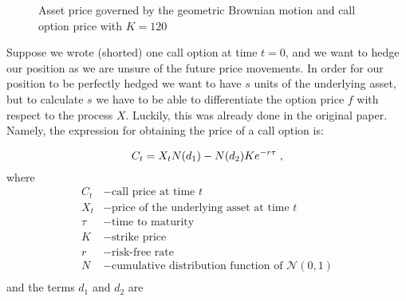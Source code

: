 \documentclass[times, utf8, diplomski]{fer}
\begin{document}
\begin{figure}[ht]
\centering

\caption{Asset price governed by the geometric Brownian motion and call option price with $K=120$}
\label{fig:gbm_price_process}	
\end{figure}
\noindent Suppose we wrote (shorted) one call option at time $t=0$, and we want to hedge our position as we are unsure of the future price movements. In order for our position to be perfectly hedged we want to have $s$ units of the underlying asset, but to calculate $s$ we have to be able to differentiate the option price $f$ with respect to the process $X$. Luckily, this was already done in the original \cite{black_pricing_1972} paper. Namely, the expression for obtaining the price of a call option is:

\begin{equation} \label{eqn:bs_call}
	C_t = X_tN(d_1) - N(d_2)Ke^{-r\tau} \hspace{0.1cm},
\end{equation}
where
\begin{align*}
	C_t &- \mbox{call price at time } t \\
	X_t &- \mbox{price of the underlying asset at time } t \\
	\tau &- \mbox{time to maturity} \\
	K &- \mbox{strike price} \\
	r &- \mbox{risk-free rate} \\
	N &- \mbox{cumulative distribution function of } \mathcal{N}(0,1) \\
\end{align*}
and the terms $d_1$ and $d_2$ are
\end{document}
